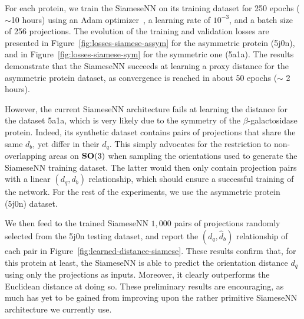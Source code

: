 For each protein, we train the SiameseNN on its training dataset for 250 epochs ($\sim$10 hours) using an Adam optimizer~\cite{kingma2014adam}, a learning rate of $10^{-3}$, and a batch size of 256 projections. The evolution of the training and validation losses are presented in Figure~\ref{fig:losses-siamese-assym} for the asymmetric protein (5j0n), and in Figure~\ref{fig:losses-siamese-sym} for the symmetric one (5a1a). The results demonstrate that the SiameseNN succeeds at learning a proxy distance for the asymmetric protein dataset, as convergence is reached in about 50 epochs ($\sim$ 2 hours).

However, the current SiameseNN architecture fails at learning the distance for the dataset 5a1a, which is very likely due to the symmetry of the $\beta$-galactosidase protein. Indeed, its synthetic dataset contains pairs of projections that share the same $d_b$, yet differ in their $d_q$. This simply advocates for the restriction to non-overlapping areas on $\mathrm{\mathbf{SO}}(3)$ when sampling the orientations used to generate the SiameseNN training dataset. The latter would then only contain projection pairs with a linear $(d_q,d_b)$ relationship, which should ensure a successful training of the network. For the rest of the experiments, we use the asymmetric protein (5j0n) dataset.

We then feed to the trained SiameseNN $1,000$ pairs of projections randomly selected from the 5j0n testing dataset, and report the $(d_q,\widehat{d}_b)$ relationship of each pair in Figure~\ref{fig:learned-distance-siamese}. These results confirm that, for this protein at least, the SiameseNN is able to predict the orientation distance $d_q$ using only the projections as inputs. Moreover, it clearly outperforms the Euclidean distance at doing so. These preliminary results are encouraging, as much has yet to be gained from improving upon the rather primitive SiameseNN architecture we currently use.
